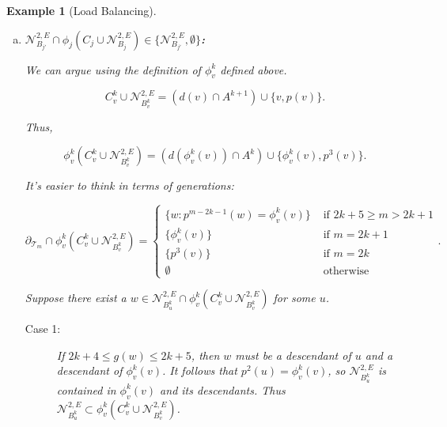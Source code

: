 \documentclass[12pt]{article}
\newcommand{\mc}{\mathcal}
\newcommand{\te}{\text}
\newcommand{\ind}{\hspace{24pt}}
\newcommand{\bdry}[1]{\partial_{#1}}				%
\newcommand{\indx}[1]{^{#1}}						%
\newcommand{\deneigh}[1]{\mc{N}^{2,E}_{#1}}			%
\newcommand{\tree}[1]{\mc{T}_{#1}}					%
\newcommand{\desc}{d}								%
\newtheorem{example}[thms]{Example}
\begin{document}
\begin{example}[Load Balancing]
\begin{description}
\begin{enumerate}[(a)]
\ind Notice that this does not uniquely define \(\phi\indx{k}_v\), but it does define \(\phi\indx{k}_v\) on all vertices we are interested in. In particular, if \(u\) is \(p(v)\) or a descendant of \(p(v)\) and \(u \in \bdry{\tree{m}}\), then \(\phi\indx{k}_v(u) \in \bdry{\tree{m-2}}\).

\ind Now we can address the problem. Fix \(k\) and \(v \in \bdry{\tree{2k+3}}\). Notice that \(C\indx{k}_v\cup\deneigh{B\indx{k}_v} \subset \cup_{m=2k+2}^{2k+7} \bdry{\tree{m}}\). Furthermore, all elements of \(C\indx{k}_v\cup\deneigh{B\indx{k}_v}\) except \(p(v)\) are descendants of \(p(v)\). Thus,

\[\phi\indx{k}_v(C\indx{k}_v\cup\deneigh{B\indx{k}_v}) \subset \cup_{m=2k}^{2k+5} \bdry{\tree{m}} \subseteq A\indx{k}.\]

Furthermore, if \(u \in B\indx{k}_v \setminus C\indx{k}_v\), then \(g(u) > 2k+7\), so \(\phi\indx{k}_v(u) \in \bdry{\tree{m}}\) for some \(m > 2k+5\). But then \(\bdry{\tree{m}}\cap A\indx{k} = \emptyset\), so \(\phi\indx{k}_v(u) \notin A\indx{k}\).

\item {\bfseries\boldmath \(\deneigh{B_{j'}}\cap\phi_j(C_j\cup\deneigh{B_j}) \in \{\deneigh{B_{j'}},\emptyset\}\):}

We can argue using the definition of \(\phi\indx{k}_v\) defined above. 

\[C\indx{k}_v\cup\deneigh{B\indx{k}_v} = \left(\desc(v)\cap A\indx{k+1}\right)\cup\{v,p(v)\}.\]

Thus,

\[\phi\indx{k}_v(C\indx{k}_v\cup\deneigh{B\indx{k}_v}) = \left(\desc(\phi\indx{k}_v(v))\cap A\indx{k}\right)\cup\{\phi\indx{k}_v(v),p^3(v)\}.\]

\ind It's easier to think in terms of generations:

\[\bdry{\tree{m}}\cap \phi\indx{k}_v(C\indx{k}_v\cup\deneigh{B\indx{k}_v}) = \begin{cases}
\{w: p^{m-2k-1}(w) = \phi\indx{k}_v(v)\} &\te{ if } 2k+5\geq m > 2k+1\\
\{\phi\indx{k}_v(v)\} &\te{ if } m = 2k+1\\
\{p^3(v)\} &\te{ if } m = 2k\\
\emptyset &\te{ otherwise}
\end{cases}.\]

\ind Suppose there exist a \(w \in \deneigh{B\indx{k}_u}\cap \phi\indx{k}_v(C\indx{k}_v\cup\deneigh{B\indx{k}_v})\) for some \(u\). 

\begin{description}
\item[Case 1: ] If \(2k+4\leq g(w) \leq 2k+5\), then \(w\) must be a descendant of \(u\) and a descendant of \(\phi\indx{k}_v(v)\). It follows that \(p^2(u) = \phi\indx{k}_v(v)\), so \(\deneigh{B\indx{k}_u}\) is contained in \(\phi\indx{k}_v(v)\) and its descendants. Thus \(\deneigh{B\indx{k}_u} \subset \phi\indx{k}_v(C\indx{k}_v\cup\deneigh{B\indx{k}_v})\).


\end{description}
\end{enumerate}
\end{description}
\end{example}
\end{document}
